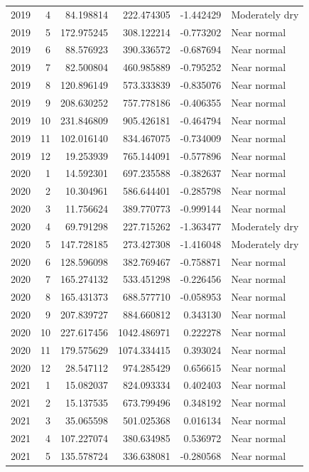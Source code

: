 \begin{tabular}{rrrrrl}
2019 & 4 & 84.198814 & 222.474305 & -1.442429 & Moderately dry \\
2019 & 5 & 172.975245 & 308.122214 & -0.773202 & Near normal \\
2019 & 6 & 88.576923 & 390.336572 & -0.687694 & Near normal \\
2019 & 7 & 82.500804 & 460.985889 & -0.795252 & Near normal \\
2019 & 8 & 120.896149 & 573.333839 & -0.835076 & Near normal \\
2019 & 9 & 208.630252 & 757.778186 & -0.406355 & Near normal \\
2019 & 10 & 231.846809 & 905.426181 & -0.464794 & Near normal \\
2019 & 11 & 102.016140 & 834.467075 & -0.734009 & Near normal \\
2019 & 12 & 19.253939 & 765.144091 & -0.577896 & Near normal \\
2020 & 1 & 14.592301 & 697.235588 & -0.382637 & Near normal \\
2020 & 2 & 10.304961 & 586.644401 & -0.285798 & Near normal \\
2020 & 3 & 11.756624 & 389.770773 & -0.999144 & Near normal \\
2020 & 4 & 69.791298 & 227.715262 & -1.363477 & Moderately dry \\
2020 & 5 & 147.728185 & 273.427308 & -1.416048 & Moderately dry \\
2020 & 6 & 128.596098 & 382.769467 & -0.758871 & Near normal \\
2020 & 7 & 165.274132 & 533.451298 & -0.226456 & Near normal \\
2020 & 8 & 165.431373 & 688.577710 & -0.058953 & Near normal \\
2020 & 9 & 207.839727 & 884.660812 & 0.343130 & Near normal \\
2020 & 10 & 227.617456 & 1042.486971 & 0.222278 & Near normal \\
2020 & 11 & 179.575629 & 1074.334415 & 0.393024 & Near normal \\
2020 & 12 & 28.547112 & 974.285429 & 0.656615 & Near normal \\
2021 & 1 & 15.082037 & 824.093334 & 0.402403 & Near normal \\
2021 & 2 & 15.137535 & 673.799496 & 0.348192 & Near normal \\
2021 & 3 & 35.065598 & 501.025368 & 0.016134 & Near normal \\
2021 & 4 & 107.227074 & 380.634985 & 0.536972 & Near normal \\
2021 & 5 & 135.578724 & 336.638081 & -0.280568 & Near normal \\

\end{tabular}
